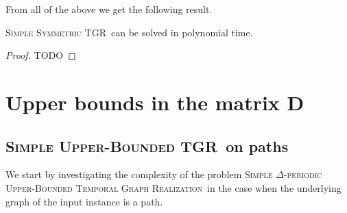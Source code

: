 \documentclass[a4paper,UKenglish,cleveref, autoref, thm-restate]{lipics-v2021}
\newcommand{\deltaSymExact}{\textsc{Simple Symmetric TGR}}
\newcommand{\DeltaUpperBoundLong}{\textsc{Simple $\Delta$-periodic Upper-Bounded Temporal Graph Realization}}
\newcommand{\deltaUpperBound}{\textsc{Simple Upper-Bounded TGR}}
\begin{document}
From all of the above we get the following result.
\begin{theorem}
	\deltaSymExact\ can be solved in polynomial time.
\end{theorem}
\begin{proof}
	TODO
\end{proof}

\section{Upper bounds in the matrix D}

\subsection{\deltaUpperBound\ on paths}
We start by investigating the complexity of the problem \DeltaUpperBoundLong\ in the case when the underlying graph of the input instance is a path.
\end{document}
